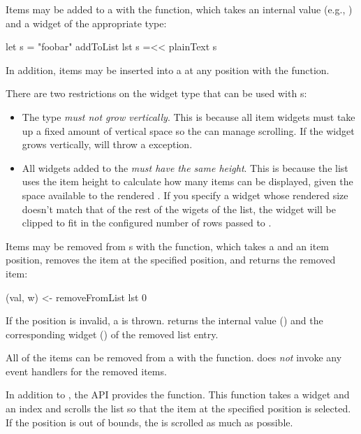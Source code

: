 Items may be added to a  with the  function,
which takes an internal value (e.g., ) and a widget of the
appropriate type:

\begin{haskellcode}
 let s = "foobar"
 addToList lst s =<< plainText s
\end{haskellcode}

In addition, items may be inserted into a  at any position with
the  function.

There are two restrictions on the widget type that can be used with
s:

\begin{itemize}
\item The  type \textit{must not grow vertically}.  This
  is because all  item widgets must take up a fixed amount of
  vertical space so the  can manage scrolling.  If the widget
  grows vertically,  will throw a 
  exception.
\item All widgets added to the  \textit{must have the same
  height}.  This is because the list uses the item height to calculate
  how many items can be displayed, given the space available to the
  rendered .  If you specify a widget whose rendered size
  doesn't match that of the rest of the wigets of the list, the widget will be
  clipped to fit in the configured number of rows passed to .
\end{itemize}

Items may be removed from s with the 
function, which takes a  and an item position,
removes the item at the specified position, and returns the removed
item:

\begin{haskellcode}
 (val, w) <- removeFromList lst 0
\end{haskellcode}

If the position is invalid, a  is thrown.
 returns the internal value () and the
corresponding widget () of the removed list entry.

All of the items can be removed from a  with the
 function.   does \textit{not} invoke any
event handlers for the removed items.

In addition to , the  API provides the
 function.  This function takes a  widget and
an index and scrolls the list so that the item at the specified
position is selected.  If the position is out of bounds, the 
is scrolled as much as possible.


